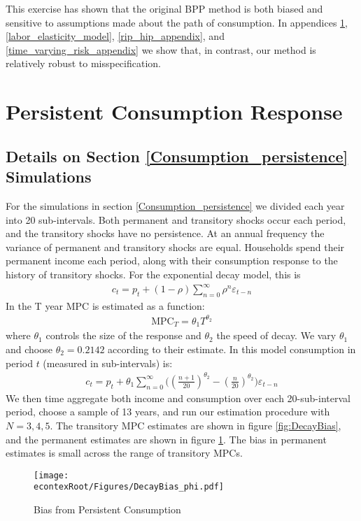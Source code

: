 \documentclass[titlepage]{\econtex}\newcommand{\texname}{ConsumptionHeterogeneity}
\begin{document}
This exercise has shown that the original BPP method is both biased and sensitive to assumptions made about the path of consumption. In appendices \ref{consumption_persistence_appendix}, \ref{labor_elasticity_model}, \ref{rip_hip_appendix}, and \ref{time_varying_risk_appendix} we show that, in contrast, our method is relatively robust to misspecification.

\section{Persistent Consumption Response} \label{consumption_persistence_appendix}
\setcounter{figure}{0}   
\setcounter{table}{0} 
\subsection{Details on Section \ref{Consumption_persistence} Simulations}
For the simulations in section \ref{Consumption_persistence} we divided each year into 20 sub-intervals. Both permanent and transitory shocks occur each period, and the transitory shocks have no persistence. At an annual frequency the variance of permanent and transitory shocks are equal. Households spend their permanent income each period, along with their consumption response to the history of transitory shocks. For the exponential decay model, this is
\begin{align*}
c_t = p_t + (1-\rho)\sum_{n=0}^{\infty}\rho^n \varepsilon_{t-n}
\end{align*}
In \cite{fagereng_mpc_2016} the T year MPC is estimated as a function:
\begin{align*}
\text{MPC}_T = \theta_1 T^{\theta_2}
\end{align*}
where $\theta_1$ controls the size of the response and $\theta_2$ the speed of decay. We vary $\theta_1$ and choose $\theta_2= 0.2142$ according to their estimate. In this model consumption in period $t$ (measured in sub-intervals) is:
\begin{align*}
c_t = p_t + \theta_1\sum_{n=0}^{\infty}\Big( (\frac{n+1}{20})^{\theta_2} -(\frac{n}{20})^{\theta_2} \Big)\varepsilon_{t-n}
\end{align*}
We then time aggregate both income and consumption over each 20-sub-interval period, choose a sample of 13 years, and run our estimation procedure with $N=3,4,5$. The transitory MPC estimates are shown in figure \ref{fig:DecayBias}, and the permanent estimates are shown in figure \ref{fig:DecayBias_phi}. The bias in permanent estimates is small across the range of transitory MPCs.
\begin{figure} 
	\begin{centering}
		\texttt{[image: \\econtexRoot/Figures/DecayBias\_phi.pdf]}
		\caption{Bias from Persistent Consumption}
		\label{fig:DecayBias_phi}
	\end{centering}
\end{figure}
\end{document}
